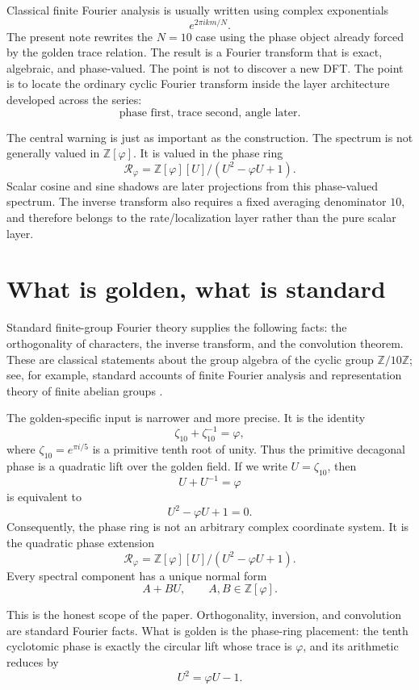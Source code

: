 \documentclass[11pt]{article}
\newcommand{\ph}{\varphi}
\newcommand{\Z}{\mathbb{Z}}
\newcommand{\RR}{\mathcal R_\ph}
\newcommand{\zz}{\zeta}
\begin{document}
Classical finite Fourier analysis is usually written using complex exponentials
\[
    e^{2\pi i km/N}.
\]
The present note rewrites the $N=10$ case using the phase object already forced by the golden trace relation.  The result is a Fourier transform that is exact, algebraic, and phase-valued.  The point is not to discover a new DFT.  The point is to locate the ordinary cyclic Fourier transform inside the layer architecture developed across the series:
\[
    \text{phase first, trace second, angle later.}
\]

The central warning is just as important as the construction.  The spectrum is not generally valued in $\Z[\ph]$.  It is valued in the phase ring
\[
    \RR=\Z[\ph][U]/(U^2-\ph U+1).
\]
Scalar cosine and sine shadows are later projections from this phase-valued spectrum.  The inverse transform also requires a fixed averaging denominator $10$, and therefore belongs to the rate/localization layer rather than the pure scalar layer.

\section{What is golden, what is standard}

Standard finite-group Fourier theory supplies the following facts: the orthogonality of characters, the inverse transform, and the convolution theorem.  These are classical statements about the group algebra of the cyclic group $\Z/10\Z$; see, for example, standard accounts of finite Fourier analysis and representation theory of finite abelian groups \cite{TerrasFourier,SerreRepresentations}.

The golden-specific input is narrower and more precise.  It is the identity
\[
    \zz_{10}+\zz_{10}^{-1}=\ph,
\]
where $\zz_{10}=e^{\pi i/5}$ is a primitive tenth root of unity.  Thus the primitive decagonal phase is a quadratic lift over the golden field.  If we write $U=\zz_{10}$, then
\[
    U+U^{-1}=\ph
\]
is equivalent to
\[
    U^2-\ph U+1=0.
\]
Consequently, the phase ring is not an arbitrary complex coordinate system.  It is the quadratic phase extension
\[
    \RR=\Z[\ph][U]/(U^2-\ph U+1).
\]
Every spectral component has a unique normal form
\[
    A+BU,
    \qquad A,B\in\Z[\ph].
\]

This is the honest scope of the paper.  Orthogonality, inversion, and convolution are standard Fourier facts.  What is golden is the phase-ring placement: the tenth cyclotomic phase is exactly the circular lift whose trace is $\ph$, and its arithmetic reduces by
\[
    U^2=\ph U-1.
\]
\end{document}
